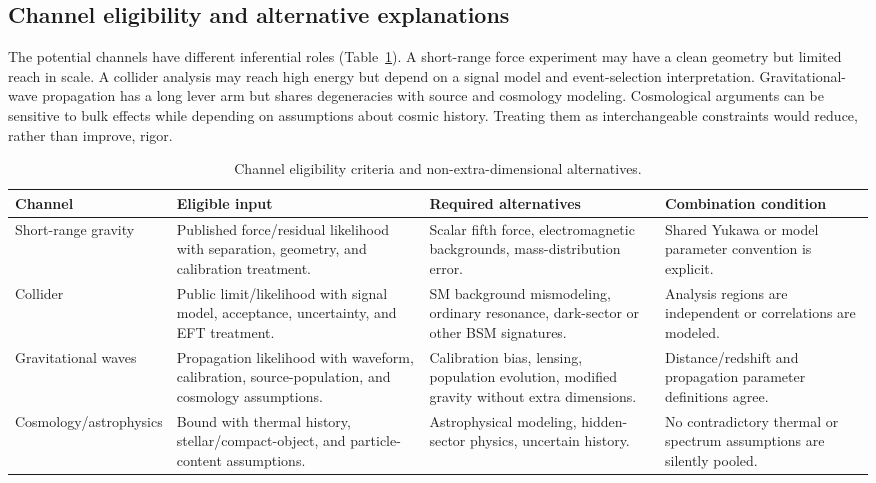 \documentclass[conference]{IEEEtran}
\begin{document}
\subsection{Channel eligibility and alternative explanations}

The potential channels have different inferential roles (Table~\ref{tab:channels}). A short-range force experiment may have a clean geometry but limited reach in scale. A collider analysis may reach high energy but depend on a signal model and event-selection interpretation. Gravitational-wave propagation has a long lever arm but shares degeneracies with source and cosmology modeling. Cosmological arguments can be sensitive to bulk effects while depending on assumptions about cosmic history. Treating them as interchangeable constraints would reduce, rather than improve, rigor.

\begin{table}[t]
\caption{Channel eligibility criteria and non-extra-dimensional alternatives.}
\label{tab:channels}
\centering
\footnotesize
\setlength{\tabcolsep}{2.7pt}
\begin{tabular}{p{} p{} p{} p{}}
\toprule
\textbf{Channel} & \textbf{Eligible input} & \textbf{Required alternatives} & \textbf{Combination condition} \\
\midrule
Short-range gravity & Published force/residual likelihood with separation, geometry, and calibration treatment. & Scalar fifth force, electromagnetic backgrounds, mass-distribution error. & Shared Yukawa or model parameter convention is explicit. \\
Collider & Public limit/likelihood with signal model, acceptance, uncertainty, and EFT treatment. & SM background mismodeling, ordinary resonance, dark-sector or other BSM signatures. & Analysis regions are independent or correlations are modeled. \\
Gravitational waves & Propagation likelihood with waveform, calibration, source-population, and cosmology assumptions. & Calibration bias, lensing, population evolution, modified gravity without extra dimensions. & Distance/redshift and propagation parameter definitions agree. \\
Cosmology/astrophysics & Bound with thermal history, stellar/compact-object, and particle-content assumptions. & Astrophysical modeling, hidden-sector physics, uncertain history. & No contradictory thermal or spectrum assumptions are silently pooled. \\
\bottomrule
\end{tabular}
\end{table}
\end{document}
